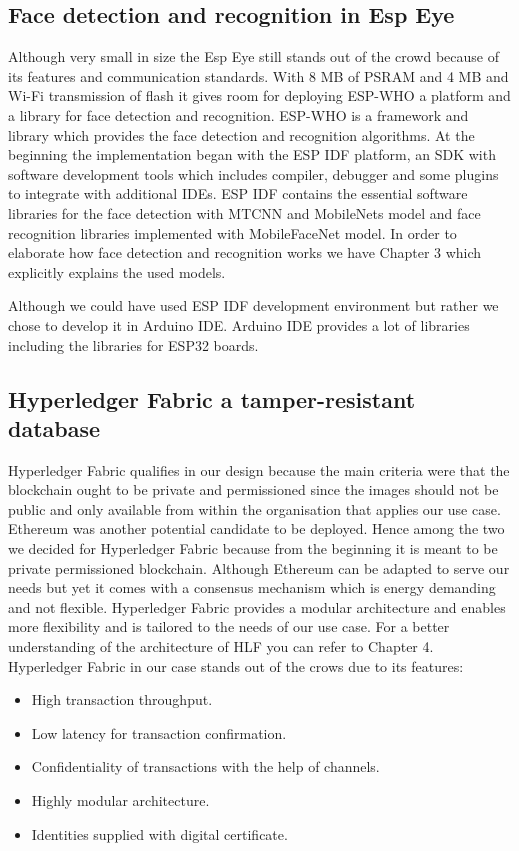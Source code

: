\subsection{Face detection and recognition in Esp Eye}
Although very small in size the Esp Eye still stands out of the crowd because of its features and communication standards. With 8 MB of PSRAM and 4 MB and Wi-Fi transmission of flash it gives room for deploying ESP-WHO a platform and a library for face detection and recognition. ESP-WHO is a framework and library which provides the face detection and recognition algorithms. At the beginning the implementation began with the ESP IDF platform, an SDK with software development tools which includes compiler, debugger and some plugins to integrate with additional IDEs.  ESP IDF contains the essential software libraries for the face detection with MTCNN and MobileNets model and face recognition libraries implemented with MobileFaceNet model. In order to elaborate how face detection and recognition works we have Chapter 3 which explicitly explains the used models. 

Although we could have used ESP IDF development environment but rather we chose to develop it in Arduino IDE. Arduino IDE provides a lot of libraries including the libraries for ESP32 boards. 



\subsection{Hyperledger Fabric a tamper-resistant database}

  Hyperledger Fabric qualifies in our design because the main criteria were that the blockchain ought to be private and permissioned since the images should not be public and only available from within the organisation that applies our use case. Ethereum was another potential candidate to be deployed. Hence among the two we decided for Hyperledger Fabric because from the beginning it is meant to be private permissioned blockchain. Although Ethereum can be adapted to serve our needs but yet it comes with a consensus mechanism which is energy demanding and not flexible. Hyperledger Fabric provides a modular architecture and enables more flexibility and is tailored to the needs of our use case. For a better understanding of the architecture of HLF you can refer to Chapter 4.  Hyperledger Fabric in our case stands out of the crows due to its features: 

\begin{itemize}
    \item High transaction throughput.
    \item Low latency for transaction confirmation.
    \item Confidentiality of transactions with the help of channels.
    \item Highly modular architecture.
    \item Identities supplied with digital certificate.
\end{itemize}

